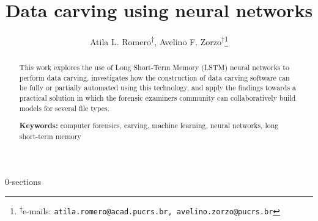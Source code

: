 \documentclass[english,oneside]{article}
\author{Atila L. Romero\textsuperscript{$\dagger$}, Avelino F. Zorzo\textsuperscript{$\dagger$}{\let\thefootnote\relax\footnote{{\textsuperscript{$\dagger$}e-mails: \texttt{atila.romero@acad.pucrs.br, avelino.zorzo@pucrs.br}}}}}
\title{Data carving using neural networks}
\date{}
\begin{document}
\maketitle

\begin{abstract}
This work explores the use of Long Short-Term Memory (LSTM) neural networks to perform data carving, investigates how the construction of data carving software can be fully or partially automated using this technology, and apply the findings towards a practical solution in which the forensic examiners community can collaboratively build models for several file types.

\textbf{Keywords:} computer forensics, carving, machine learning, neural networks, long short-term memory
\end{abstract}

{0-sections}

% 
%


\end{document}
